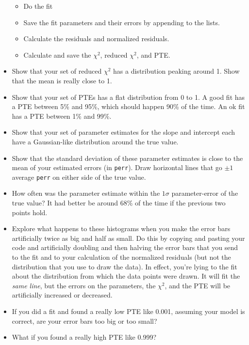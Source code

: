 \documentclass[11pt]{hmcpset}
\begin{document}
\begin{problem}
\begin{itemize}
\begin{itemize}
			\item Do the fit
			\item Save the fit parameters and their errors by appending to the lists.
			\item Calculate the residuals and normalized residuals.
			\item Calculate and save the $\chi^2$, reduced $\chi^2$, and PTE.
		\end{itemize}
		\item Show that your set of reduced $\chi^2$ has a distribution peaking around 1. Show that the mean is really close to 1.
		\item Show that your set of PTEs has a flat distribution from 0 to 1. A good fit has a PTE between 5\% and 95\%, which should happen 90\% of the time. An ok fit has a PTE between 1\% and 99\%.
		\item Show that your set of parameter estimates for the slope and intercept each have a Gaussian-like distribution around the true value.
		\item Show that the standard deviation of these parameter estimates is close to the mean of your estimated errors (in \texttt{perr}). Draw horizontal lines that go $\pm1$ average \texttt{perr} on either side of the true value.
		\item How often was the parameter estimate within the $1\sigma$ parameter-error of the true value? It had better be around 68\% of the time if the previous two points hold.
		\item Explore what happens to these histograms when you make the error bars artificially twice as big and half as small. Do this by copying and pasting your code and artificially doubling and then halving the error bars that you send to the fit and to your calculation of the normalized residuals (but not the distribution that you use to draw the data). In effect, you're lying to the fit about the distribution from which the data points were drawn. It will fit the \textit{same line}, but the errors on the parameters, the $\chi^2$, and the PTE will be artificially increased or decreased.
		\item If you did a fit and found a really low PTE like 0.001, assuming your model is correct, are your error bars too big or too small?
		\item What if you found a really high PTE like 0.999?
\end{itemize}

\end{problem}



\begin{solution}

\vfill

\end{solution}

\pagebreak
\end{document}
